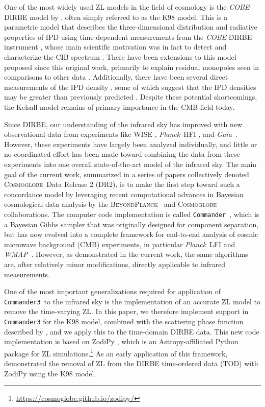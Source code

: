 \documentclass[twocolumn]{aa}
\def\commander{\texttt{Commander}}
\def\commanderthree{\texttt{Commander3}}
\def\Planck{\textit{Planck}}
\def\WMAP{\textit{WMAP}}
\def\GAIA{\textit{Gaia}}
\newcommand{\BP}{\textsc{BeyondPlanck}}
\newcommand{\cosmoglobe}{\textsc{Cosmoglobe}}
\begin{document}
One of the most widely used ZL models in the field of cosmology is the
\textit{COBE}-DIRBE model by \citet{kelsall1998}, often simply
referred to as the K98 model. This is a parametric model that describes 
the three-dimensional distribution and radiative 
properties of IPD using time-dependent measurements from
the \textit{COBE}-DIRBE instrument \citep{hauser1998}, whose 
main scientific motivation was in fact to detect
and characterize the CIB spectrum \citep{hauser1998,hauser:2001}. There have been 
extensions to this model proposed since this original work, primarily to 
explain residual monopoles seen in comparisons to other data \citep{sano, Korngut,  skysurf}. 
Additionally, there have been several direct measurements of the IPD density 
\citep{newhorizons, parker}, some of which suggest that the IPD densities may 
be greater than previously predicted \citep{pioneer}. Despite these potential 
shortcomings, the Kelsall model remains of primary importance in the CMB field today.

Since DIRBE, our
understanding of the infrared sky has improved with new observational
data from experiments like WISE \citep{wright:2010}, \Planck\ HFI
\citep{planck2016-l03}, and \GAIA\ \citep{gaia:2016}. However, these
experiments have largely been analyzed individually, and little or no
coordinated effort has been made toward combining the data from these
experiments into one overall state-of-the-art model of the infrared
sky. The main goal of the current work, summarized in a series of
papers collectively denoted \cosmoglobe\ Data Release 2 (DR2), is to make
the first step toward such a concordance model by leveraging recent
computational advances in Bayesian cosmological data analysis by the
\BP\ \citep[][and references therein]{BP2023} and
\cosmoglobe\ \citep{Watts2023} collaborations. The computer code
implementation is called \commander\ \citep{eriksen:2004, seljebotn:2019, bp03}, which
is a Bayesian Gibbs sampler that was originally designed for component separation, but has now evolved into a complete framework for
end-to-end analysis of cosmic microwave background (CMB) experiments,
in particular \Planck\ LFI \citep{planck2016-l02} and \WMAP\
\citep{bennett2012}. However, as demonstrated in the current work, the
same algorithms are, after relatively minor modifications, directly
applicable to infrared measurements.

One of the most important generalizations required for application of
\commanderthree\ to the infrared sky is the implementation of an
accurate ZL model to remove the time-varying ZL. In this paper, we therefore implement 
support in \texttt{Commander3} for the K98 model, combined with the scattering phase function described 
by \citet{Hong}, and we apply this to the time-domain DIRBE data. 
This new code implementation is based on ZodiPy \citep{San2024}, which is an Astropy-affiliated 
Python package for ZL simulations.\footnote{\url{https://cosmoglobe.github.io/zodipy/}} As an early application of this framework, \cite{San2022} 
demonstrated the removal of ZL from the DIRBE time-ordered data (TOD) with ZodiPy using the 
K98 model. 
\end{document}
